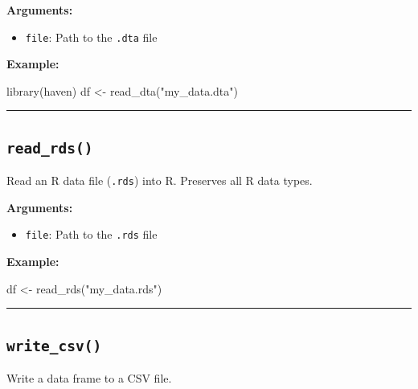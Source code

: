 \documentclass[
  letterpaper,
  DIV=11,
  numbers=noendperiod]{scrreprt}
\newenvironment{Shaded}{\begin{snugshade}}{\end{snugshade}}
\newcommand{\FunctionTok}[1]{\textcolor[rgb]{0.28,0.35,0.67}{#1}}
\newcommand{\NormalTok}[1]{\textcolor[rgb]{0.00,0.23,0.31}{#1}}
\newcommand{\OtherTok}[1]{\textcolor[rgb]{0.00,0.23,0.31}{#1}}
\newcommand{\StringTok}[1]{\textcolor[rgb]{0.13,0.47,0.30}{#1}}
\providecommand{\tightlist}{%
  \setlength{\itemsep}{0pt}\setlength{\parskip}{0pt}}
\begin{document}
\textbf{Arguments:}

\begin{itemize}
\tightlist
\item
  \texttt{file}: Path to the \texttt{.dta} file
\end{itemize}

\textbf{Example:}

\begin{Shaded}
\begin{Highlighting}[]
\FunctionTok{library}\NormalTok{(haven)}
\NormalTok{df }\OtherTok{\textless{}{-}} \FunctionTok{read\_dta}\NormalTok{(}\StringTok{"my\_data.dta"}\NormalTok{)}
\end{Highlighting}
\end{Shaded}

\begin{center}\rule{0.5\linewidth}{0.5pt}\end{center}

\subsection{\texorpdfstring{\texttt{read\_rds()}}{read\_rds()}}\label{read_rds}

Read an R data file (\texttt{.rds}) into R. Preserves all R data types.

\textbf{Arguments:}

\begin{itemize}
\tightlist
\item
  \texttt{file}: Path to the \texttt{.rds} file
\end{itemize}

\textbf{Example:}

\begin{Shaded}
\begin{Highlighting}[]
\NormalTok{df }\OtherTok{\textless{}{-}} \FunctionTok{read\_rds}\NormalTok{(}\StringTok{"my\_data.rds"}\NormalTok{)}
\end{Highlighting}
\end{Shaded}

\begin{center}\rule{0.5\linewidth}{0.5pt}\end{center}

\subsection{\texorpdfstring{\texttt{write\_csv()}}{write\_csv()}}\label{write_csv}

Write a data frame to a CSV file.
\end{document}
